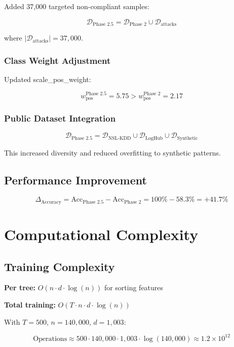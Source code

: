 \documentclass[12pt,a4paper]{article}
\begin{document}
Added 37,000 targeted non-compliant samples:

$$\mathcal{D}_{\text{Phase 2.5}} = \mathcal{D}_{\text{Phase 2}} \cup \mathcal{D}_{\text{attacks}}$$

where $|\mathcal{D}_{\text{attacks}}| = 37{,}000$.

\subsubsection{Class Weight Adjustment}

Updated scale\_pos\_weight:

$$w_{\text{pos}}^{\text{Phase 2.5}} = 5.75 > w_{\text{pos}}^{\text{Phase 2}} = 2.17$$

\subsubsection{Public Dataset Integration}

$$\mathcal{D}_{\text{Phase 2.5}} = \mathcal{D}_{\text{NSL-KDD}} \cup \mathcal{D}_{\text{LogHub}} \cup \mathcal{D}_{\text{Synthetic}}$$

This increased diversity and reduced overfitting to synthetic patterns.

\subsection{Performance Improvement}

$$\Delta_{\text{Accuracy}} = \text{Acc}_{\text{Phase 2.5}} - \text{Acc}_{\text{Phase 2}} = 100\% - 58.3\% = +41.7\%$$

\section{Computational Complexity}

\subsection{Training Complexity}

\textbf{Per tree:} $O(n \cdot d \cdot \log(n))$ for sorting features

\textbf{Total training:} $O(T \cdot n \cdot d \cdot \log(n))$

With $T = 500$, $n = 140{,}000$, $d = 1{,}003$:

$$\text{Operations} \approx 500 \cdot 140{,}000 \cdot 1{,}003 \cdot \log(140{,}000) \approx 1.2 \times 10^{12}$$
\end{document}

